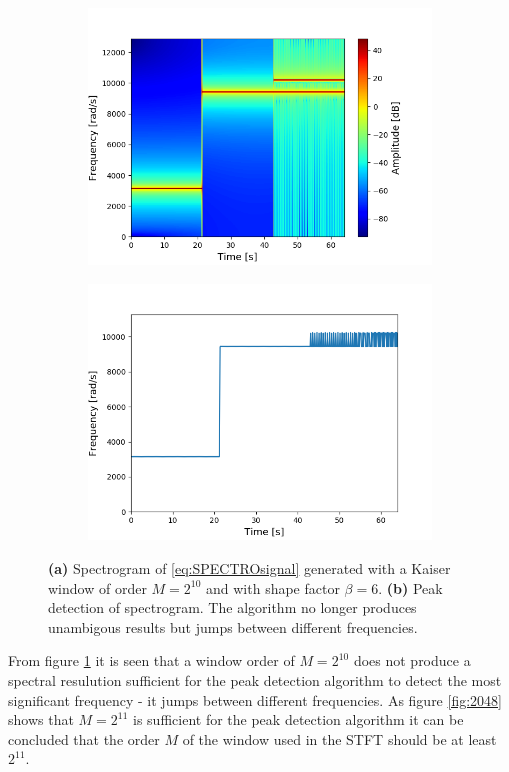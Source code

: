 \begin{figure}[H]
\centering
\begin{subfigure}{0.49\textwidth}
\centering
\includegraphics[width=\textwidth]{figures/validation/stft/peak/spectro1024.png}
\caption{}
\end{subfigure}
\begin{subfigure}{0.49\textwidth}
\centering
\includegraphics[width=\textwidth]{figures/validation/stft/peak/peak1024.png}
\caption{}
\end{subfigure}
\caption{\textbf{(a)} Spectrogram of \ref{eq:SPECTROsignal} generated with a Kaiser window of order $M=2^{10}$ and with shape factor $\beta=6$. \textbf{(b)} Peak detection of spectrogram. The algorithm no longer produces unambigous results but jumps between different frequencies.}
\label{fig:1024}
\end{figure}
From figure \ref{fig:1024} it is seen that a window order of $M=2^{10}$ does not produce a spectral resulution sufficient for the peak detection algorithm to detect the most significant frequency - it jumps between different frequencies. As figure \ref{fig:2048} shows that $M=2^{11}$ is sufficient for the peak detection algorithm it can be concluded that the order $M$ of the window used in the STFT should be at least $2^{11}$.
